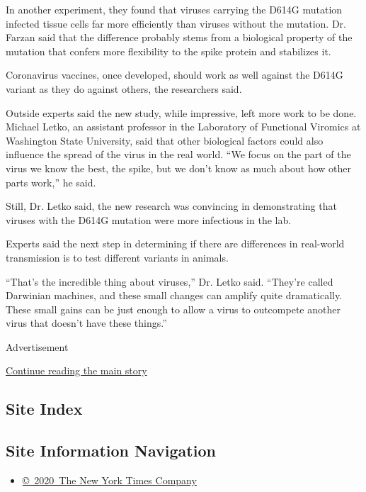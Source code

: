 In another experiment, they found that viruses carrying the D614G
mutation infected tissue cells far more efficiently than viruses without
the mutation. Dr. Farzan said that the difference probably stems from a
biological property of the mutation that confers more flexibility to the
spike protein and stabilizes it.

Coronavirus vaccines, once developed, should work as well against the
D614G variant as they do against others, the researchers said.

Outside experts said the new study, while impressive, left more work to
be done. Michael Letko, an assistant professor in the Laboratory of
Functional Viromics at Washington State University, said that other
biological factors could also influence the spread of the virus in the
real world. ``We focus on the part of the virus we know the best, the
spike, but we don't know as much about how other parts work,'' he said.

Still, Dr. Letko said, the new research was convincing in demonstrating
that viruses with the D614G mutation were more infectious in the lab.

Experts said the next step in determining if there are differences in
real-world transmission is to test different variants in animals.

``That's the incredible thing about viruses,'' Dr. Letko said. ``They're
called Darwinian machines, and these small changes can amplify quite
dramatically. These small gains can be just enough to allow a virus to
outcompete another virus that doesn't have these things.''

Advertisement

\protect\hyperlink{after-bottom}{Continue reading the main story}

\hypertarget{site-index}{%
\subsection{Site Index}\label{site-index}}

\hypertarget{site-information-navigation}{%
\subsection{Site Information
Navigation}\label{site-information-navigation}}

\begin{itemize}
\tightlist
\item
  \href{https://help.nytimes.com/hc/en-us/articles/115014792127-Copyright-notice}{©~2020~The
  New York Times Company}
\end{itemize}

